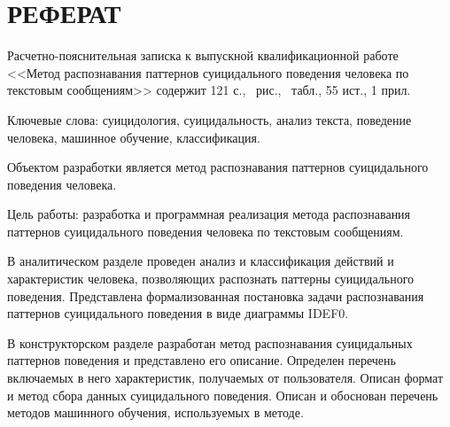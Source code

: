 \section*{РЕФЕРАТ}

Расчетно-пояснительная записка к выпускной квалификационной работе <<Метод распознавания паттернов суицидального поведения человека по текстовым сообщениям>> содержит 121  с., \totalfigures\ рис., \totaltables\ табл., 55 ист., 1 прил.

Ключевые слова: суицидология, суицидальность, анализ текста, поведение человека, машинное обучение, классификация.

Объектом разработки является метод распознавания паттернов суицидального поведения человека.

Цель работы: разработка и программная реализация метода распознавания паттернов суицидального поведения человека по текстовым сообщениям.

В аналитическом разделе проведен анализ и классификация действий и характеристик человека, позволяющих распознать паттерны суицидального поведения. 
Представлена формализованная постановка задачи распознавания паттернов суицидального поведения в виде диаграммы IDEF0.


В конструкторском разделе разработан метод распознавания суицидальных паттернов поведения и представлено его описание.
Определен перечень включаемых в него характеристик, получаемых от пользователя.
Описан формат и метод сбора данных суицидального поведения.
Описан и обоснован перечень методов машинного обучения, используемых в методе.


